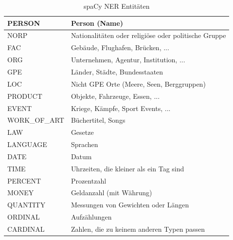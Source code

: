 \begin{table}[H]
    \centering
    \begin{tabular}{|l|l|}
    \hline
    PERSON      & Person (Name)                                        \\ \hline
    NORP        & Nationalitäten oder religiöse oder politische Gruppe \\ \hline
    FAC         & Gebäude, Flughafen, Brücken, ...                     \\ \hline
    ORG         & Unternehmen, Agentur, Institution, ...               \\ \hline
    GPE         & Länder, Städte, Bundesstaaten                        \\ \hline
    LOC         & Nicht GPE Orte (Meere, Seen, Berggruppen)            \\ \hline
    PRODUCT     & Objekte, Fahrzeuge, Essen, ...                       \\ \hline
    EVENT       & Kriege, Kämpfe, Sport Events, ...                    \\ \hline
    WORK\_OF\_ART & Büchertitel, Songs                                 \\ \hline
    LAW         & Gesetze                                              \\ \hline
    LANGUAGE    & Sprachen                                             \\ \hline
    DATE        & Datum                                                \\ \hline
    TIME        & Uhrzeiten, die kleiner als ein Tag sind              \\ \hline
    PERCENT     & Prozentzahl                                          \\ \hline
    MONEY       & Geldanzahl (mit Währung)                             \\ \hline
    QUANTITY    & Messungen von Gewichten oder Längen                  \\ \hline
    ORDINAL     & Aufzählungen                                         \\ \hline
    CARDINAL    & Zahlen, die zu keinem anderen Typen passen           \\ \hline
    \end{tabular}
    \caption{spaCy NER Entitäten}
    \label{spacy:entities}
\end{table}